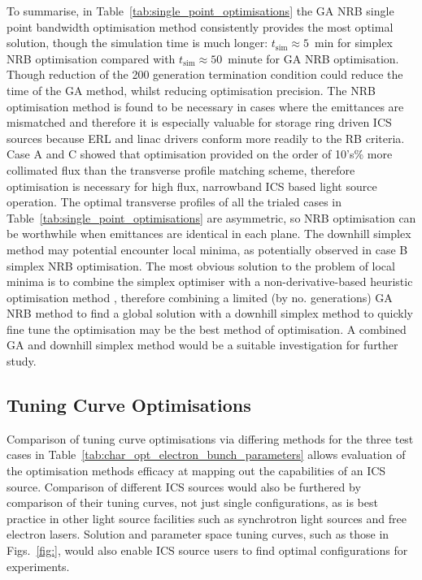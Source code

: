 \documentclass[../main.tex]{subfiles}
\begin{document}
To summarise, in Table~\ref{tab:single_point_optimisations} the GA NRB single point bandwidth optimisation method consistently provides the most optimal solution, though the simulation time is much longer: $t_{\mathrm{sim}}\approx 5$~\si{\minute} for simplex NRB optimisation compared with $t_{\mathrm{sim}}\approx 50$~\si{minute} for GA NRB optimisation. Though reduction of the 200 generation termination condition could reduce the time of the GA method, whilst reducing optimisation precision. The NRB optimisation method is found to be necessary in cases where the emittances are mismatched and therefore it is especially valuable for storage ring driven ICS sources because ERL and linac drivers conform more readily to the RB criteria. Case A and C showed that optimisation provided on the order of 10's\% more collimated flux than the transverse profile matching scheme, therefore optimisation is necessary for high flux, narrowband ICS based light source operation. The optimal transverse profiles of all the trialed cases in Table~\ref{tab:single_point_optimisations} are asymmetric, so NRB optimisation can be worthwhile when emittances are identical in each plane. The downhill simplex method may potential encounter local minima, as potentially observed in case B simplex NRB optimisation. The most obvious solution to the problem of local minima is to combine the simplex optimiser with a non-derivative-based heuristic optimisation method \cite{jones2016design}, therefore combining a limited (by no. generations) GA NRB method to find a global solution with a downhill simplex method to quickly fine tune the optimisation may be the best method of optimisation. A combined GA and downhill simplex method would be a suitable investigation for further study.

\subsection{Tuning Curve Optimisations}

Comparison of tuning curve optimisations via differing methods for the three test cases in Table~\ref{tab:char_opt_electron_bunch_parameters} allows evaluation of the optimisation methods efficacy at mapping out the capabilities of an ICS source. Comparison of different ICS sources would also be furthered by comparison of their tuning curves, not just single configurations, as is best practice in other light source facilities such as synchrotron light sources and free electron lasers. Solution and parameter space tuning curves, such as those in Figs.~\ref{fig:}, would also enable ICS source users to find optimal configurations for experiments. 
\end{document}
